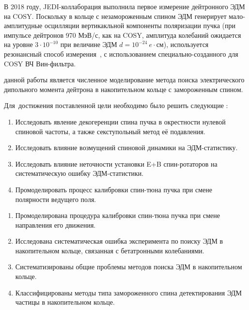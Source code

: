 В 2018 году, JEDI-коллаборация выполнила первое измерение дейтронного ЭДМ на COSY. Поскольку в кольце с
незамороженным спином ЭДМ генерирует мало-амплитудные осцилляции вертикакльной компоненты поляризации пучка
(при импульсе дейтронов 970 МэВ/с, как на COSY, амплитуда колебаний ожидается на уровне $3\cdot10^{-10}$
при величине ЭДМ $d = 10^{-24}~e\cdot$см), используется резонансный
способ измерения~\cite{COSY:Partially-Frozen-Spin, COSY:SpinTuneMapping}, с использованием специально-созданного для COSY ВЧ Вин-фильтра.~\cite{JSlim:RFWF:Design, JSlim:RFWF:Commisioning}


{\aim} данной работы является численное моделирование метода поиска электрического дипольного момента дейтрона в накопительном кольце с замороженным спином.

Для~достижения поставленной цели необходимо было решить следующие {\tasks}:
\begin{enumerate}
  \item Исследовать явление декогеренции спина пучка в окрестности нулевой спиновой частоты, а также секступольный метод её подавления. 
  \item Исследовать влияние возмущений спиновой динамики на ЭДМ-статистику.
  \item Исследовать влияние неточности установки E+B спин-ротаторов на систематическую ошибку ЭДМ-статистики.
  \item Промоделировать процесс калибровки спин-тюна пучка при смене полярности ведущего поля.
\end{enumerate}

{\novelty}
\begin{enumerate}
  \item Промоделирована процедура калибровки спин-тюна пучка при смене направления его движения. 
  \item Исследована систематическая ошибка эксперимента по поиску ЭДМ в накопительном кольце, связанная с бетатронными колебаниями.
  \item Систематизированы общие проблемы методов поиска ЭДМ в накопительном кольце.
  \item Классифицированы методы типа замороженного спина детектирования ЭДМ частицы в накопительном кольце.
\end{enumerate}

